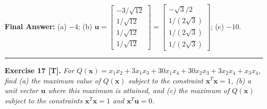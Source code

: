 \documentclass[11pt, letterpaper]{article}
\theoremstyle{definition}
\theoremstyle{remark}
\begin{document}
\textbf{Final Answer:} (a) $-4$; \quad (b) $\mathbf{u} = \begin{bmatrix} -3/\sqrt{12} \\ 1/\sqrt{12} \\ 1/\sqrt{12} \\ 1/\sqrt{12} \end{bmatrix} = \begin{bmatrix} -\sqrt{3}/2 \\ 1/(2\sqrt{3}) \\ 1/(2\sqrt{3}) \\ 1/(2\sqrt{3}) \end{bmatrix}$; \quad (c) $-10$.

\medskip
\hrule
\medskip

\textbf{Exercise 17 [T].} \emph{For $Q(\mathbf{x}) = x_1x_2 + 3x_1x_3 + 30x_1x_4 + 30x_2x_3 + 3x_2x_4 + x_3x_4$, find (a) the maximum value of $Q(\mathbf{x})$ subject to the constraint $\mathbf{x}^T\mathbf{x} = 1$, (b) a unit vector $\mathbf{u}$ where this maximum is attained, and (c) the maximum of $Q(\mathbf{x})$ subject to the constraints $\mathbf{x}^T\mathbf{x} = 1$ and $\mathbf{x}^T\mathbf{u} = 0$.}
\end{document}
